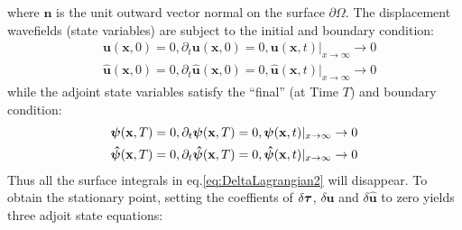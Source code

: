where $\mathbf{n}$ is the unit outward vector normal on the surface
$\partial\Omega$. The displacement wavefields (state variables) are subject to the initial and boundary condition:
\begin{equation}
	\begin{split}
	&\mathbf{u}(\mathbf{x},0)=0,\partial_t\mathbf{u}(\mathbf{x},0)=0,
	\mathbf{u}(\mathbf{x},t)\rvert_{x\rightarrow\infty}\to0\\
	&\mathbf{\hat{u}}(\mathbf{x},0)=0,\partial_t\mathbf{\hat{u}}(\mathbf{x},0)=0,
	\mathbf{\hat{u}}(\mathbf{x},t)\rvert_{x\rightarrow\infty}\to0
	\end{split}
        \label{eq:InitialBoundary}
\end{equation}
while the adjoint state variables satisfy the ``final'' (at Time $T$) and boundary condition:
\begin{equation}
	\begin{split}
	&\boldsymbol{{}\psi}(\mathbf{x},T)=0,\partial_t\boldsymbol{{}\psi}(\mathbf{x},T)=0,
	\boldsymbol{{}\psi}(\mathbf{x},t)\rvert_{x\rightarrow\infty}\to0\\
	&\boldsymbol{{}\hat\psi}(\mathbf{x},T)=0,\partial_t\boldsymbol{{}\hat{\psi}}(\mathbf{x},T)=0,
	\boldsymbol{{}\hat{\psi}}(\mathbf{x},t)\rvert_{x\rightarrow\infty}\to0
	\end{split}
        \label{eq:InitialBoundary_2}
\end{equation}
Thus all the surface integrals in eq.\eqref{eq:DeltaLagrangian2} will disappear.
To obtain the stationary point, setting the coeffients of $\delta \boldsymbol{{}\tau}$, $\delta \mathbf{u}$
and $\delta \mathbf{\hat{u}}$ to zero yields three adjoit state equations:  

